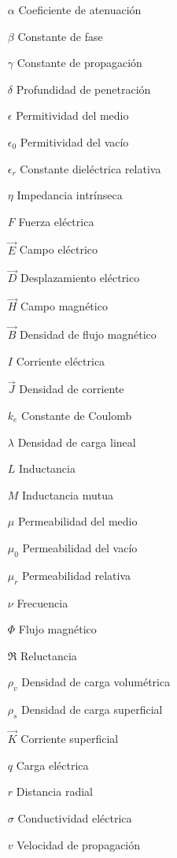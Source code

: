 \documentclass[10pt,conference]{IEEEtran}
\begin{document}
\begin{itemize}[leftmargin=1.5cm]
    \item[$\alpha$] Coeficiente de atenuación
    \item[$\beta$] Constante de fase
    \item[$\gamma$] Constante de propagación
    \item[$\delta$] Profundidad de penetración
    \item[$\epsilon$] Permitividad del medio
    \item[$\epsilon_0$] Permitividad del vacío
    \item[$\epsilon_r$] Constante dieléctrica relativa
    \item[$\eta$] Impedancia intrínseca
    \item[$F$] Fuerza eléctrica
    \item[$\vec{E}$] Campo eléctrico
    \item[$\vec{D}$] Desplazamiento eléctrico
    \item[$\vec{H}$] Campo magnético
    \item[$\vec{B}$] Densidad de flujo magnético
    \item[$I$] Corriente eléctrica
    \item[$\vec{J}$] Densidad de corriente
    \item[$k_e$] Constante de Coulomb
    \item[$\lambda$] Densidad de carga lineal
    \item[$L$] Inductancia
    \item[$M$] Inductancia mutua
    \item[$\mu$] Permeabilidad del medio
    \item[$\mu_0$] Permeabilidad del vacío
    \item[$\mu_r$] Permeabilidad relativa
    \item[$\nu$] Frecuencia
    \item[$\Phi$] Flujo magnético
    \item[$\Re$] Reluctancia
    \item[$\rho_v$] Densidad de carga volumétrica
    \item[$\rho_s$] Densidad de carga superficial
    \item[$\vec{K}$] Corriente superficial
    \item[$q$] Carga eléctrica
    \item[$r$] Distancia radial
    \item[$\sigma$] Conductividad eléctrica
    \item[$v$] Velocidad de propagación

\end{itemize}
\end{document}
